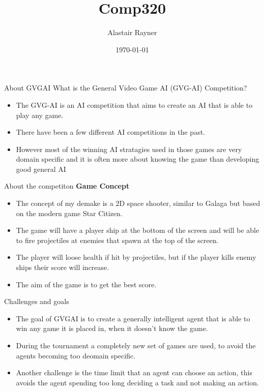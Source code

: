 \documentclass{beamer}
\title{Comp320}
\author{Alastair Rayner}
\date{\today}
\begin{document}
\maketitle


\begin{frame}{About GVGAI}
	  What is the General Video Game AI (GVG-AI) Competition? \pause
	  \begin{itemize}
	      \item The GVG-AI is an AI competition that aims to create an AI that is able to play any game. \pause
	      \item There have been a few different AI competitions in the past. \pause
	      \item However most of the winning AI stratagies used in those games are very domain specific and it is often more about knowing the game than developing good general AI \pause
	  \end{itemize}
\end{frame}


\begin{frame}{About the competiton}		
	\textbf{Game Concept} \pause
		\begin{itemize}
			\item The concept of my demake is a 2D space shooter, similar to Galaga but based on the modern game Star Citizen.  \pause
			\item The game will have a player ship at the bottom of the screen and will be able to fire projectiles at enemies that spawn at the top of the screen.\pause
			
			\item The player will loose health if hit by projectiles, but if the player kills enemy ships their score will increase.  \pause

			\item The aim of the game is to get the best score. \pause 	
		\end{itemize}
\end{frame}

\begin{frame}{Challenges and goals}		
			\begin{itemize}
			\item The goal of GVGAI is to create a generally intelligent agent that is able to win any game it is placed in, when it doesn't know the game.
			\item During the tournament a completely new set of games are used, to avoid the agents becoming too deomain specific.
			\item Another challenge is the time limit that an agent can choose an action, this avoids the agent spending too long deciding a task and not making an action.
		\end{itemize}
\end{frame}
	
\end{document}

